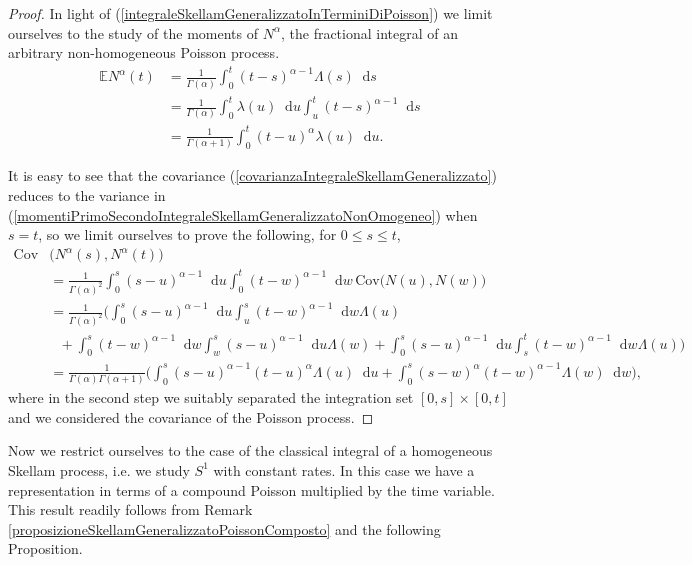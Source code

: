 \documentclass[12pt, twoside, english, headsepline]{article}
\newcommand*\dif{\mathop{}\!\mathrm{d}}  %
\theoremstyle{definition} %
\numberwithin{equation}{section} %
\begin{document}
\begin{proof}
In light of (\ref{integraleSkellamGeneralizzatoInTerminiDiPoisson}) we limit ourselves to the study of the moments of $N^\alpha$, the fractional integral of an arbitrary non-homogeneous Poisson process.
\begin{align*}
\mathbb{E}N^\alpha(t) &= \frac{1}{\Gamma(\alpha)}\int_0^t (t-s)^{\alpha-1} \Lambda(s)\dif s \\
&=\frac{1}{\Gamma(\alpha)}\int_0^t  \lambda(u)\dif u \int_u^t(t-s)^{\alpha-1} \dif s\\ 
& = \frac{1}{\Gamma(\alpha+1)}\int_0^t (t-u)^{\alpha}
 \lambda(u)\dif u.
\end{align*}

It is easy to see that the covariance (\ref{covarianzaIntegraleSkellamGeneralizzato}) reduces to the variance in (\ref{momentiPrimoSecondoIntegraleSkellamGeneralizzatoNonOmogeneo}) when $s=t$, so we limit ourselves to prove the following, for $0\le s\le t$,
\begin{align*}
 \text{Cov}&\Big(N^\alpha(s), N^\alpha(t)\Big)\\
& =  \frac{1}{\Gamma(\alpha)^2}\int_0^s (s-u)^{\alpha-1} \dif u \int_0^t(t-w)^{\alpha-1} \dif w\,  \text{Cov}\Big(N(u), N(w)\Big)\\
& = \frac{1}{\Gamma(\alpha)^2} \Biggl( \int_0^s (s-u)^{\alpha-1} \dif u \int_u^s(t-w)^{\alpha-1} \dif w \Lambda(u) \\
&\ \ \ + \int_0^s (t-w)^{\alpha-1} \dif w \int_w^s(s-u)^{\alpha-1} \dif u \Lambda(w) + \int_0^s (s-u)^{\alpha-1} \dif u \int_s^t(t-w)^{\alpha-1} \dif w \Lambda(u)\Biggr)\\
& =  \frac{1}{\Gamma(\alpha)\Gamma(\alpha+1)}\Biggl( \int_0^s (s-u)^{\alpha-1}(t-u)^{\alpha}\Lambda(u)\dif u +  \int_0^s (s-w)^{\alpha}(t-w)^{\alpha-1}\Lambda(w)\dif w \Biggr),
\end{align*}
where in the second step we suitably separated the integration set $[0,s]\times[0,t]$ and we considered the covariance of the Poisson process.
\end{proof}

Now we restrict ourselves to the case of the classical integral of a homogeneous Skellam process, i.e. we study $S^1$ with constant rates. In this case we have a representation in terms of a compound Poisson multiplied by the time variable. This result readily follows from Remark \ref{proposizioneSkellamGeneralizzatoPoissonComposto} and the following Proposition.
\end{document}
